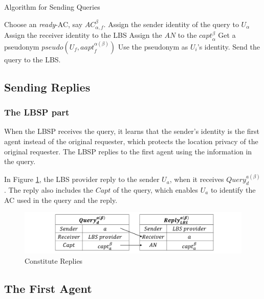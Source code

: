\begin{algorithm} [hbtp]
\caption{Algorithm for Sending Queries}\label{AlgSendACPQuery}
\begin{algorithmic}[1]
 {}
\State Choose an \textit{ready}-AC, say ${AC}_{\alpha,f}^{\beta}$.
\State Assign the sender identity of the query to $U_{\alpha}$
\State Assign the receiver identity to the LBS
\State Assign the $AN$ to the ${capt}_{\alpha}^{\beta}$
\State Get a pseudonym $pseudo\left(U_f,{aapt}_f^{\alpha \left(\beta \right)}\right)$
\State Use the pseudonym as $U_i$’s identity.
\State Send the query to the LBS.
\EndProcedure
\end{algorithmic}
\end{algorithm}

\subsection{ Sending Replies}


\subsubsection{ The LBSP part}

\noindent When the LBSP receives the query, it learns that the sender's identity is the first agent instead of the original requester, which protects the location privacy of the original requester. The LBSP replies to the first agent using the information in the query.

In Figure \ref{fig:ConstituteReplies}, the LBS provider reply to the sender $U_a$, when it receives ${Query}^{a\left(\beta\right)}_d$. The reply also includes the $Capt$ of the query, which enables $U_a$ to identify the AC used in the query and the reply.

\begin{figure} [H]
  \centering 
  \includegraphics[width=6.0in]{figures/FIG_4_6_Constitute_Replies.png}
  \caption{Constitute Replies} 
  \label{fig:ConstituteReplies} %
\end{figure}

\subsection{ The First Agent}

